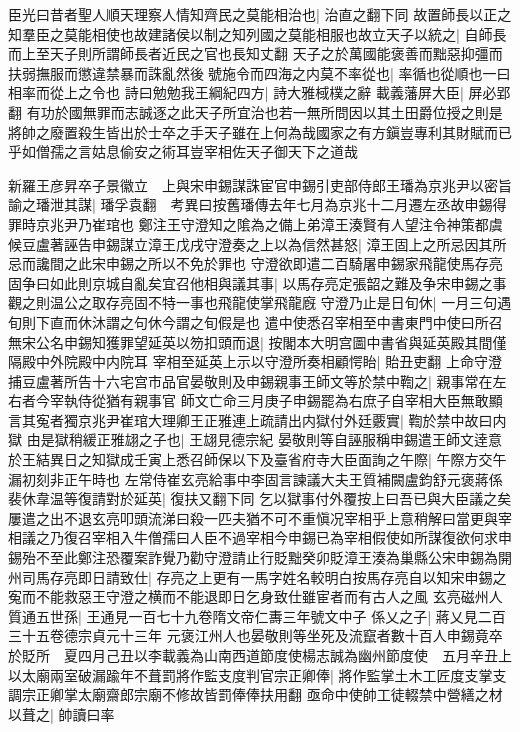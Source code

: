 臣光曰昔者聖人順天理察人情知齊民之莫能相治也|{
	治直之翻下同}
故置師長以正之知羣臣之莫能相使也故建諸侯以制之知列國之莫能相服也故立天子以統之|{
	自師長而上至天子則所謂師長者近民之官也長知丈翻}
天子之於萬國能褒善而黜惡抑彊而扶弱撫服而懲違禁暴而誅亂然後號施令而四海之内莫不率從也|{
	率循也從順也一曰相率而從上之令也}
詩曰勉勉我王綱紀四方|{
	詩大雅棫樸之辭}
載義藩屏大臣|{
	屏必郢翻}
有功於國無罪而志誠逐之此天子所宜治也若一無所問因以其土田爵位授之則是將帥之廢置殺生皆出於士卒之手天子雖在上何為哉國家之有方鎭豈專利其財賦而已乎如僧孺之言姑息偷安之術耳豈宰相佐天子御天下之道哉

新羅王彦昇卒子景徽立　上與宋申錫謀誅宦官申錫引吏部侍郎王璠為京兆尹以密旨諭之璠泄其謀|{
	璠孚袁翻　考異曰按舊璠傳去年七月為京兆十二月遷左丞故申錫得罪時京兆尹乃崔琯也}
鄭注王守澄知之隂為之備上弟漳王湊賢有人望注令神策都虞候豆盧著誣告申錫謀立漳王戊戌守澄奏之上以為信然甚怒|{
	漳王固上之所忌因其所忌而讒間之此宋申錫之所以不免於罪也}
守澄欲即遣二百騎屠申錫家飛龍使馬存亮固争曰如此則京城自亂矣宜召他相與議其事|{
	以馬存亮定張韶之難及争宋申錫之事觀之則温公之取存亮固不特一事也飛龍使掌飛龍廐}
守澄乃止是日旬休|{
	一月三句遇旬則下直而休沐謂之句休今謂之旬假是也}
遣中使悉召宰相至中書東門中使曰所召無宋公名申錫知獲罪望延英以笏扣頭而退|{
	按閣本大明宫圖中書省與延英殿其間僅隔殿中外院殿中内院耳}
宰相至延英上示以守澄所奏相顧愕眙|{
	貽丑吏翻}
上命守澄捕豆盧著所告十六宅宫市品官晏敬則及申錫親事王師文等於禁中鞫之|{
	親事常在左右者今宰執侍從猶有親事官}
師文亡命三月庚子申錫罷為右庶子自宰相大臣無敢顯言其寃者獨京兆尹崔琯大理卿王正雅連上疏請出内獄付外廷覈實|{
	鞫於禁中故曰内獄}
由是獄稍緩正雅翃之子也|{
	王翃見德宗紀}
晏敬則等自誣服稱申錫遣王師文逹意於王結異日之知獄成壬寅上悉召師保以下及臺省府寺大臣面詢之午際|{
	午際方交午漏初刻非正午時也}
左常侍崔玄亮給事中李固言諫議大夫王質補闕盧鈞舒元褒蔣係裴休韋温等復請對於延英|{
	復扶又翻下同}
乞以獄事付外覆按上曰吾已與大臣議之矣屢遣之出不退玄亮叩頭流涕曰殺一匹夫猶不可不重愼况宰相乎上意稍解曰當更與宰相議之乃復召宰相入牛僧孺曰人臣不過宰相今申錫已為宰相假使如所謀復欲何求申錫殆不至此鄭注恐覆案詐覺乃勸守澄請止行貶黜癸卯貶漳王湊為巢縣公宋申錫為開州司馬存亮即日請致仕|{
	存亮之上更有一馬字姓名較明白按馬存亮自以知宋申錫之寃而不能救惡王守澄之横而不能退即日乞身致仕雖宦者而有古人之風}
玄亮磁州人質通五世孫|{
	王通見一百七十九卷隋文帝仁夀三年號文中子}
係乂之子|{
	蔣乂見二百三十五卷德宗貞元十三年}
元褒江州人也晏敬則等坐死及流竄者數十百人申錫竟卒於貶所　夏四月己丑以李載義為山南西道節度使楊志誠為幽州節度使　五月辛丑上以太廟兩室破漏踰年不葺罰將作監支度判官宗正卿俸|{
	將作監掌土木工匠度支掌支調宗正卿掌太廟齋郎宗廟不修故皆罰俸俸扶用翻}
亟命中使帥工徒輟禁中營繕之材以葺之|{
	帥讀曰率}
